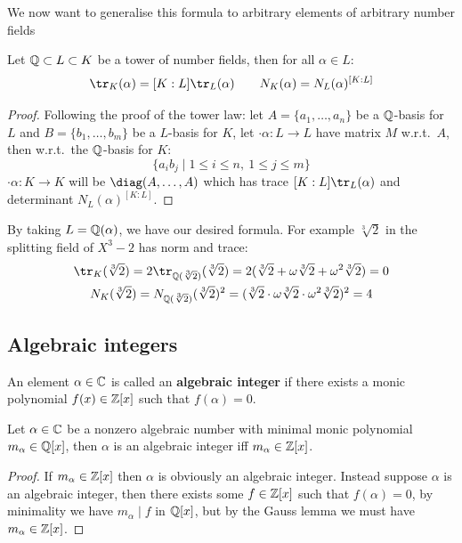 \documentclass{article}
\begin{document}
We now want to generalise this formula to arbitrary elements of arbitrary number fields

\begin{proposition}
    Let $\mathbb{Q}\subset L \subset K$ be a tower of number fields, then for all $\alpha\in L$: \[
    \tr_K(\alpha) = [K:L]\tr_L(\alpha) \qquad N_K(\alpha) = N_L(\alpha)^{[K:L]}
    \]\begin{proof}
        Following the proof of the tower law: let $A=\{a_1,\ldots,a_n\}$ be a $\mathbb{Q}$-basis for $L$ and $B=\{b_1,\ldots,b_m\}$ be a $L$-basis for $K$, let $\cdot\alpha:L\rightarrow L$ have matrix $M$ w.r.t.~$A$, then w.r.t.~the $\mathbb{Q}$-basis for $K$: \[
        \{a_ib_j \mid 1\leq i \leq n, \ 1 \leq j \leq m\}
        \] $\cdot\alpha:K\rightarrow K$ will be $\diag(A,\ldots,A)$ which has trace $[K:L]\tr_L(\alpha)$ and determinant $N_L(\alpha)^{[K:L]}$.
    \end{proof}
\end{proposition}

By taking $L=\mathbb{Q}(\alpha)$, we have our desired formula. For example $\sqrt[3]{2}$ in the splitting field of $X^3-2$ has norm and trace:\vspace{-12pt}\begin{gather*}
\tr_K(\sqrt[3]{2}) = 2\tr_{\bQ(\sqrt[3]{2})}(\sqrt[3]{2}) = 2(\sqrt[3]{2} + \omega \sqrt[3]{2} + \omega^2\sqrt[3]{2}) = 0 \\
N_K(\sqrt[3]{2}) = N_{\bQ(\sqrt[3]{2})}(\sqrt[3]{2})^2 = (\sqrt[3]{2}\cdot \omega\sqrt[3]{2} \cdot \omega^2\sqrt[3]{2})^2 = 4
\end{gather*}

\subsection{Algebraic integers}

\begin{definition}
    An element $\alpha\in\mathbb{C}$ is called an \textbf{algebraic integer} if there exists a monic polynomial $f(x)\in\mathbb{Z}[x]$ such that $f(\alpha)=0$.
\end{definition}

\begin{proposition}
    Let $\alpha\in\mathbb{C}$ be a nonzero algebraic number with minimal monic polynomial $m_\alpha\in\mathbb{Q}[x]$, then $\alpha$ is an algebraic integer iff $m_\alpha\in\mathbb{Z}[x]$.
    \begin{proof}
        If $m_\alpha\in\mathbb{Z}[x]$ then $\alpha$ is obviously an algebraic integer. Instead suppose $\alpha$ is an algebraic integer, then there exists some $f\in\mathbb{Z}[x]$ such that $f(\alpha)=0$, by minimality we have $m_\alpha\mid f$ in $\mathbb{Q}[x]$, but by the Gauss lemma we must have $m_\alpha\in\mathbb{Z}[x]$.
    \end{proof}
\end{proposition}
\end{document}
